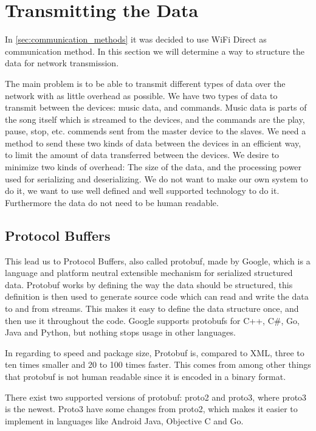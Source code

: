 \section{Transmitting the Data}
In \cref{sec:communication_methods} it was decided to use WiFi Direct as communication method.
In this section we will determine a way to structure the data for network transmission.

\bigskip

The main problem is to be able to transmit different types of data over the network with as little overhead as possible.
We have two types of data to transmit between the devices: music data, and commands. 
Music data is parts of the song itself which is streamed to the devices,
and the commands are the play, pause, stop, etc. commends sent from the master device to the slaves. 
We need a method to send these two kinds of data between the devices in an efficient way,
to limit the amount of data transferred between the devices.
We desire to minimize two kinds of overhead: The size of the data, and the processing power used for serializing and deserializing. 
We do not want to make our own system to do it, we want to use well defined and well supported technology to do it.
Furthermore the data do not need to be human readable.

\subsection{Protocol Buffers}
This lead us to Protocol Buffers, also called protobuf, made by Google, which is a language and platform neutral extensible mechanism for serialized structured data. 
Protobuf works by defining the way the data should be structured, this definition is then used to generate source code which can read and write the data to and from streams.\cite{protobuf}
This makes it easy to define the data structure once, and then use it throughout the code.
Google supports protobufs for C++, C\#, Go, Java and Python, but nothing stops usage in other languages\cite{protobuf}.

In regarding to speed and package size, Protobuf is, compared to XML, three to ten times smaller and 20 to 100 times faster.
This comes from among other things that protobuf is not human readable since it is encoded in a binary format.\cite{protobuf} 

There exist two supported versions of protobuf: proto2 and proto3, where proto3 is the newest.
Proto3 have some changes from proto2, which makes it easier to implement in languages like Android Java, Objective C and Go.\cite{proto3}

